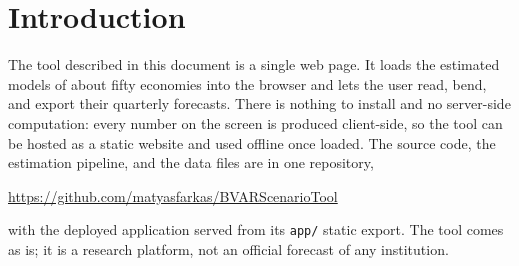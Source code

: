 \documentclass[11pt]{article}
\theoremstyle{plain}
\theoremstyle{remark}
\begin{document}
\section{Introduction}\label{sec:intro}

The tool described in this document is a single web page. It loads the
estimated models of about fifty economies into the browser and lets the
user read, bend, and export their quarterly forecasts. There is nothing
to install and no server-side computation: every number on the screen is
produced client-side, so the tool can be hosted as a static website and
used offline once loaded. The source code, the estimation pipeline, and
the data files are in one repository,
\begin{center}
\url{https://github.com/matyasfarkas/BVARScenarioTool}
\end{center}
with the deployed application served from its \texttt{app/} static
export. The tool comes as is; it is a research platform, not an official
forecast of any institution.
\end{document}
